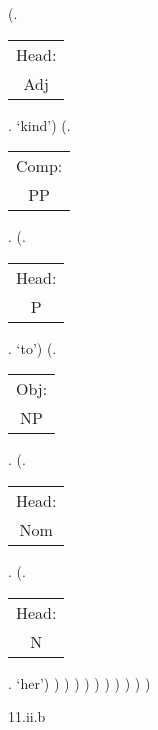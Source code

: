 \documentclass[12pt,letterpaper]{article}
\begin{document}
\begin{figure}
\begin{center}
\begin{parsetree}
			(.\begin{tabular}{c}Head:\\Adj\end{tabular}. `kind')
			(.\begin{tabular}{c}Comp:\\PP\end{tabular}.
			(.\begin{tabular}{c}Head:\\P\end{tabular}. `to')
			(.\begin{tabular}{c}Obj:\\NP\end{tabular}. 
			(.\begin{tabular}{c}Head:\\Nom\end{tabular}. 
			(.\begin{tabular}{c}Head:\\N\end{tabular}. `her')
			)
			)
			)
			)
			)
			)
			)
			)
			)
			)
			
		\end{parsetree}
		\hfill \break \hfill \break
		11.ii.b 
	\end{center}
\end{figure}


\clearpage
\end{document}
